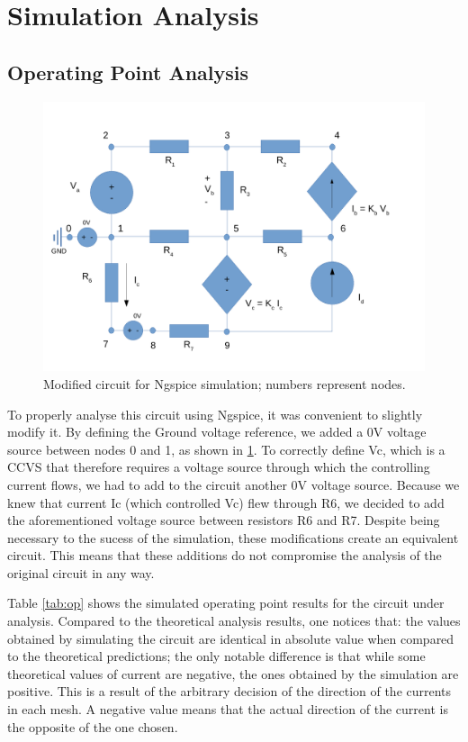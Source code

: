 \section{Simulation Analysis}
\label{sec:simulation}

\subsection{Operating Point Analysis}

\begin{figure}[hp]
\centering
\includegraphics[width=0.8\linewidth]{circuit_sim.pdf}
\caption{Modified circuit for Ngspice simulation; numbers represent nodes.}
\label{fig:circuit_sim}
\end{figure}

\newpage

To properly analyse this circuit using Ngspice, it was convenient to slightly modify it. By defining the Ground voltage reference, we added a 0V voltage source between nodes 0 and 1, as shown in \ref{fig:circuit_sim}. To correctly define Vc, which is a CCVS that therefore requires a voltage source through which the controlling current flows, we had to add to the circuit another 0V voltage source. Because we knew that current Ic (which controlled Vc) flew through R6, we decided to add the aforementioned voltage source between resistors R6 and R7.
Despite being necessary to the sucess of the simulation, these modifications create an equivalent circuit. This means that these additions do not compromise the analysis of the original circuit in any way.

Table \ref{tab:op} shows the simulated operating point results for the circuit
under analysis. Compared to the theoretical analysis results, one notices that: the values obtained by simulating the circuit are identical in absolute value when compared to the theoretical predictions; the only notable difference is that while some theoretical values of current are negative, the ones obtained by the simulation are positive. This is a result of the arbitrary decision of the direction of the currents in each mesh. A negative value means that the actual direction of the current is the opposite of the one chosen.

